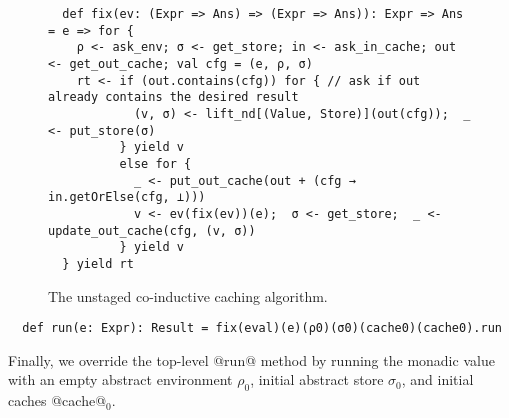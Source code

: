 \begin{figure}[h!]
  \centering
\begin{lstlisting}
  def fix(ev: (Expr => Ans) => (Expr => Ans)): Expr => Ans = e => for {
    ρ <- ask_env; σ <- get_store; in <- ask_in_cache; out <- get_out_cache; val cfg = (e, ρ, σ)
    rt <- if (out.contains(cfg)) for { // ask if out already contains the desired result
            (v, σ) <- lift_nd[(Value, Store)](out(cfg));  _ <- put_store(σ)
          } yield v
          else for {
            _ <- put_out_cache(out + (cfg → in.getOrElse(cfg, ⊥)))
            v <- ev(fix(ev))(e);  σ <- get_store;  _ <- update_out_cache(cfg, (v, σ))
          } yield v
  } yield rt
\end{lstlisting}
\vspace{-1em}
\caption{The unstaged co-inductive caching algorithm.}
\label{fig:coind_cache}
\vspace{-1em}
\end{figure}

\begin{lstlisting}
  def run(e: Expr): Result = fix(eval)(e)(ρ0)(σ0)(cache0)(cache0).run
\end{lstlisting}

Finally, we override the top-level @run@ method by running the monadic value
with an empty abstract environment $\rho_0$, initial abstract store $\sigma_0$,
and initial caches @cache@$_0$.
